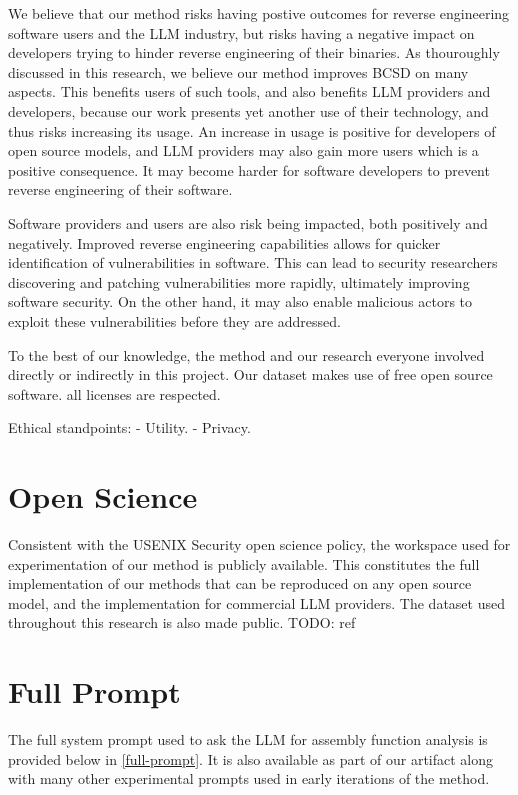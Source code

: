 We believe that our method risks having postive outcomes for reverse engineering software users and
the LLM industry, but risks having a negative impact on developers trying to hinder reverse engineering of their binaries. As
thouroughly discussed in this research, we believe our method improves BCSD on many aspects. This benefits users of such tools,
and also benefits LLM providers and developers, because our work presents yet another use of their technology, and thus risks
increasing its usage. An increase in usage is positive for developers of open source models, and LLM providers may also gain more users
which is a positive consequence. It may become harder for software developers to prevent reverse engineering of their software.

Software providers and users are also risk being impacted, both positively and negatively. Improved reverse engineering
capabilities allows for quicker identification of vulnerabilities in software. This can lead to security researchers
discovering and patching vulnerabilities more rapidly, ultimately improving software security. On the other hand, it may
also enable malicious actors to exploit these vulnerabilities before they are addressed. 

To the best of our knowledge, the method and our research everyone involved directly or indirectly in this project.
Our dataset makes use of free open source software. all licenses are respected.

Ethical standpoints:
- Utility.
- Privacy.

\section*{Open Science}

Consistent with the USENIX Security open science policy, the workspace used for experimentation
of our method is publicly available. This constitutes the full implementation of our methods that can be reproduced on
any open source model, and the implementation for commercial LLM providers. The dataset used throughout this research
is also made public. TODO: ref




\appendix

\section{Full Prompt}

The full system prompt used to ask the LLM for assembly function analysis is provided below in \autoref{full-prompt}. It is also available as
part of our artifact along with many other experimental prompts used in early iterations of the method.

